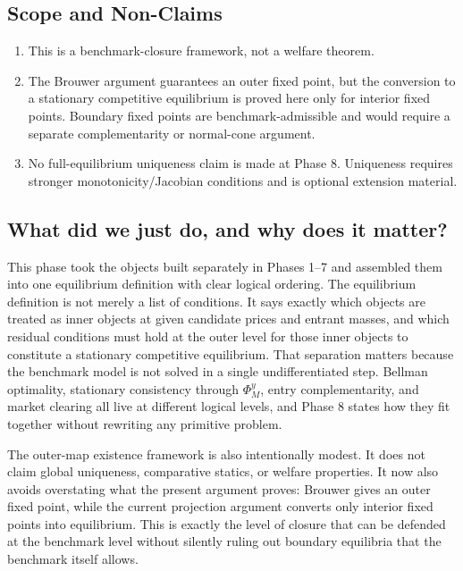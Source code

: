 \subsection{Scope and Non-Claims}

\begin{enumerate}
    \item This is a benchmark-closure framework, not a welfare theorem.
    \item The Brouwer argument guarantees an outer fixed point, but the conversion to a stationary competitive equilibrium is proved here only for interior fixed points. Boundary fixed points are benchmark-admissible and would require a separate complementarity or normal-cone argument.
    \item No full-equilibrium uniqueness claim is made at Phase 8. Uniqueness requires stronger monotonicity/Jacobian conditions and is optional extension material.
\end{enumerate}

\subsection{What did we just do, and why does it matter?}

This phase took the objects built separately in Phases 1--7 and assembled them into one equilibrium definition with clear logical ordering. The equilibrium definition is not merely a list of conditions. It says exactly which objects are treated as inner objects at given candidate prices and entrant masses, and which residual conditions must hold at the outer level for those inner objects to constitute a stationary competitive equilibrium. That separation matters because the benchmark model is not solved in a single undifferentiated step. Bellman optimality, stationary consistency through $\Phi_M^y$, entry complementarity, and market clearing all live at different logical levels, and Phase 8 states how they fit together without rewriting any primitive problem.

The outer-map existence framework is also intentionally modest. It does not claim global uniqueness, comparative statics, or welfare properties. It now also avoids overstating what the present argument proves: Brouwer gives an outer fixed point, while the current projection argument converts only interior fixed points into equilibrium. This is exactly the level of closure that can be defended at the benchmark level without silently ruling out boundary equilibria that the benchmark itself allows.

